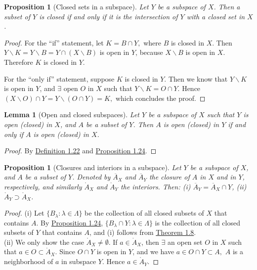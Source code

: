 \documentclass{article}
\numberwithin{equation}{section}
\theoremstyle{plain}
\newtheorem{lemma}[theorem]{Lemma}
\newtheorem{proposition}[theorem]{Proposition}
\theoremstyle{definition}
\begin{document}
\begin{proposition}[Closed sets in a subspace]\label{prop:1.24} Let $Y$ be a subspace of $X$. Then a subset of $Y$ is closed if and only if it is the intersection of $Y$ with a closed set in $X$.
\end{proposition}
\begin{proof}
For the ``if'' statement, let $K=B\cap Y,$ where $B$ is closed in $X$. Then $Y\backslash K = Y\backslash B = Y\cap (X\backslash B)$ is open in $Y$, because $X\backslash B$ is open in $X$. Therefore $K$ is closed in $Y$.

For the ``only if'' statement, suppose $K$ is closed in $Y$. Then we know that $Y\backslash K$ is open in $Y$, and $\exists$ open $O$ in $X$ such that $Y\backslash K = O\cap Y$. Hence $(X\backslash O)\cap Y= Y\backslash (O\cap Y) = K,$ which concludes the proof.
\end{proof}

\begin{lemma}[Open and closed subspaces]\label{lemma:1.25}
Let $Y$ be a subspace of $X$ such that $Y$ is open (closed) in $X$, and $A$ be a subset of $Y$. Then $A$ is open (closed) in $Y$ if and only if $A$ is open (closed) in $X$.
\end{lemma}
\begin{proof}
By \hyperref[def:1.22]{Definition 1.22} and \hyperref[prop:1.24]{Proposition 1.24}.
\end{proof}

\begin{proposition}[Closures and interiors in a subspace]\label{prop:1.26}
Let $Y$ be a subspace of $X$, and $A$ be a subset of $Y$. Denoted by $\overline{A}_X$ and $\overline{A}_Y$ the closure of $A$ in $X$ and in $Y$, respectively, and similarly $\mathring{A}_X$ and $\mathring{A}_Y$ the interiors. Then: (i) $\overline{A}_Y = \overline{A}_X\cap Y$, (ii) $\mathring{A}_Y\supset\mathring{A}_X$.
\end{proposition}
\begin{proof}
(i) Let $\{B_\lambda:\lambda\in\Lambda\}$ be the collection of all closed subsets of $X$ that contains $A$. By \hyperref[prop:1.24]{Proposition 1.24}, $\{B_\lambda\cap Y:\lambda\in\Lambda\}$ is the collection of all closed subsets of $Y$ that contains $A$, and (i) follows from \hyperref[thm:1.8]{Theorem 1.8}.\\
(ii) We only show the case $\mathring{A}_X\neq\emptyset$. If $a\in\mathring{A}_X$, then $\exists$ an open set $O$ in $X$ such that $a\in O\subset\mathring{A}_X$. Since $O\cap Y$ is open in $Y$, and we have $a\in O\cap Y\subset A,$ $A$ is a neighborhood of $a$ in subspace $Y$. Hence $a\in\mathring{A}_Y$.
\end{proof}
\end{document}
